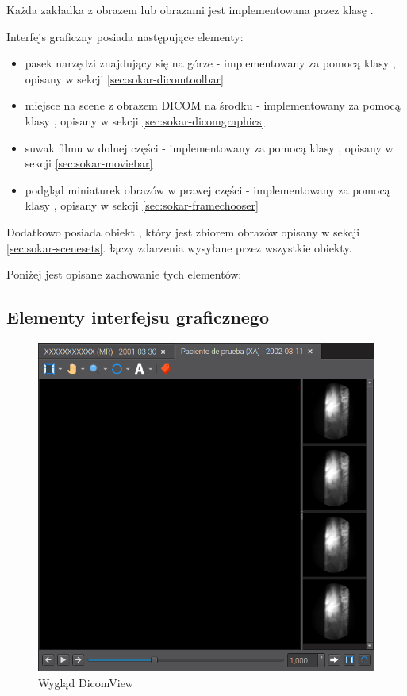 
Każda zakładka z obrazem lub obrazami jest implementowana przez klasę .

Interfejs graficzny  posiada następujące elementy:
\begin{itemize}
    \item pasek narzędzi znajdujący się na górze - implementowany za pomocą klasy , opisany w sekcji \ref{sec:sokar-dicomtoolbar}
    \item miejsce na scene z obrazem DICOM na środku - implementowany za pomocą klasy , opisany w sekcji \ref{sec:sokar-dicomgraphics}
    \item suwak filmu w dolnej części - implementowany za pomocą klasy , opisany w sekcji \ref{sec:sokar-moviebar}
    \item podgląd miniaturek obrazów w prawej części - implementowany za pomocą klasy , opisany w sekcji \ref{sec:sokar-framechooser}
\end{itemize}

Dodatkowo posiada obiekt , który jest zbiorem obrazów opisany w sekcji \ref{sec:sokar-scenesets}.
 łączy zdarzenia wysyłane przez wszystkie obiekty.

Poniżej jest opisane zachowanie tych elementów:

\subsection{Elementy interfejsu graficznego}

\begin{figure}[!htbp]
    \centering
    \includegraphics[width=\textwidth]{img/sokar-dicomview-001.png}
    \caption{Wygląd DicomView}
    \label{fig:sokar-dicomview001}
\end{figure}


